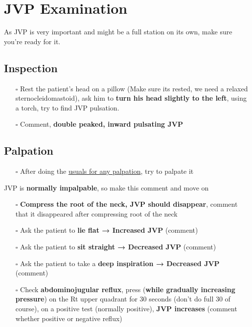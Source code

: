 \documentclass[
  13.5pt,
  a4paper,
  DIV=11,
  numbers=noendperiod]{scrreprt}
\providecommand{\tightlist}{%
  \setlength{\itemsep}{0pt}\setlength{\parskip}{0pt}}
\begin{document}
\section{JVP Examination}\label{jvp-examination}

As JVP is very important and might be a full station on its own, make
sure you're ready for it.

\subsection{Inspection}\label{inspection}

\begin{itemize}
\tightlist
\item[$\square$]
  Rest the patient's head on a pillow (Make sure its rested, we need a
  relaxed sternocleidomastoid), ask him to \textbf{turn his head
  slightly to the left}, using a torch, try to find JVP pulsation.
\item[$\square$]
  Comment, \textbf{double peaked, inward pulsating JVP}
\end{itemize}

\subsection{Palpation}\label{palpation}

\begin{itemize}
\tightlist
\item[$\square$]
  After doing the \href{miscellaneous.qmd}{usuals for any palpation},
  try to palpate it
\end{itemize}

JVP is \textbf{normally impalpable}, so make this comment and move on

\begin{itemize}
\tightlist
\item[$\square$]
  \textbf{Compress the root of the neck, JVP should disappear}, comment
  that it disappeared after compressing root of the neck
\item[$\square$]
  Ask the patient to \textbf{lie flat → Increased JVP} (comment)
\item[$\square$]
  Ask the patient to \textbf{sit straight → Decreased JVP} (comment)
\item[$\square$]
  Ask the patient to take a \textbf{deep inspiration → Decreased JVP}
  (comment)
\item[$\square$]
  Check \textbf{abdominojugular reflux}, press (\textbf{while gradually
  increasing pressure}) on the Rt upper quadrant for 30 seconds (don't
  do full 30 of course), on a positive test (normally positive),
  \textbf{JVP increases} (comment whether positive or negative reflux)
\end{itemize}
\end{document}
